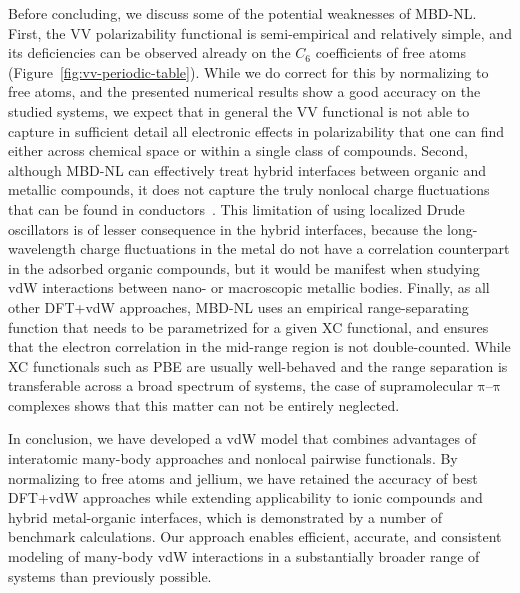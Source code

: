 Before concluding, we discuss some of the potential weaknesses of MBD-NL\@.
First, the VV polarizability functional is semi-empirical and relatively simple, and its deficiencies can be observed already on the $C_6$ coefficients of free atoms (Figure~\ref{fig:vv-periodic-table}).
While we do correct for this by normalizing to free atoms, and the presented numerical results show a good accuracy on the studied systems, we expect that in general the VV functional is not able to capture in sufficient detail all electronic effects in polarizability that one can find either across chemical space or within a single class of compounds.
Second, although MBD-NL can effectively treat hybrid interfaces between organic and metallic compounds, it does not capture the truly nonlocal charge fluctuations that can be found in conductors~\cite{DobsonIJQC14}.
This limitation of using localized Drude oscillators is of lesser consequence in the hybrid interfaces, because the long-wavelength charge fluctuations in the metal do not have a correlation counterpart in the adsorbed organic compounds, but it would be manifest when studying vdW interactions between nano- or macroscopic metallic bodies.
Finally, as all other DFT+vdW approaches, MBD-NL uses an empirical range-separating function that needs to be parametrized for a given XC functional, and ensures that the electron correlation in the mid-range region is not double-counted.
While XC functionals such as PBE are usually well-behaved and the range separation is transferable across a broad spectrum of systems, the case of supramolecular $\mathrm\pi$--$\mathrm\pi$ complexes shows that this matter can not be entirely neglected.

In conclusion, we have developed a vdW model that combines advantages of interatomic many-body approaches and nonlocal pairwise functionals.
By normalizing to free atoms and jellium, we have retained the accuracy of best DFT+vdW approaches while extending applicability to ionic compounds and hybrid metal-organic interfaces, which is demonstrated by a number of benchmark calculations.
Our approach enables efficient, accurate, and consistent modeling of many-body vdW interactions in a substantially broader range of systems than previously possible.
